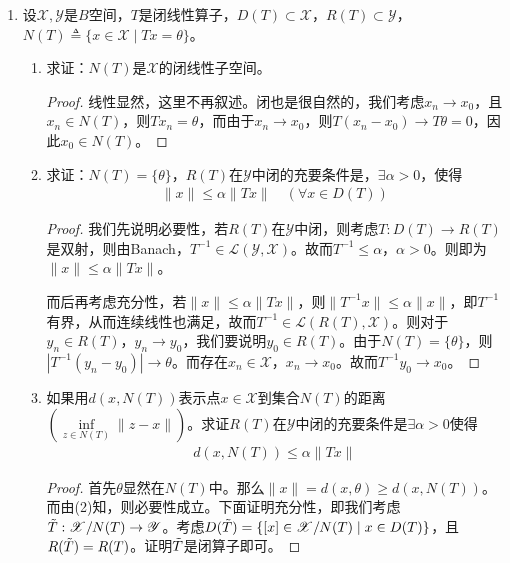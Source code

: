 \begin{enumerate}[leftmargin=2cm, label=\arabic*]
		\item 设$\mathscr{X},\mathscr{Y}$是$B$空间，$T$是闭线性算子，$D(T)\subset \mathscr{X}$，$R(T)\subset\mathscr{Y}$，$N(T)\triangleq\{x\in\mathscr{X}\mid Tx = \theta\}$。
		\begin{enumerate}[leftmargin=1cm, label=(\arabic*)]
			\item 求证：$N(T)$是$\mathscr{X}$的闭线性子空间。
			\begin{proof}
				线性显然，这里不再叙述。闭也是很自然的，我们考虑$x_n\to x_0$，且$x_n\in N(T)$，则$Tx_n = \theta$，而由于$x_n \to x_0$，则$T(x_n-x_0) \to T\theta = 0$，因此$x_0\in N(T)$。
			\end{proof}
			
			\item 求证：$N(T) = \{\theta\}$，$R(T)$在$\mathscr{Y}$中闭的充要条件是，$\exists \alpha>0$，使得
			\begin{align*}
				\|x\| \leqslant \alpha\|Tx\| \quad (\forall x\in D(T))
			\end{align*}
			\begin{proof}
				我们先说明必要性，若$R(T)$在$\mathscr{Y}$中闭，则考虑$T:D(T)\to R(T)$是双射，则由Banach，$T^{-1}\in\mathscr{L}(\mathscr{Y},\mathscr{X})$。故而$T^{-1}\leqslant \alpha$，$\alpha>0$。则即为$\|x\| \leqslant \alpha \|Tx\|$。
				
				而后再考虑充分性，若$\|x\| \leqslant \alpha \|Tx\|$，则$\|T^{-1}x\|\leqslant \alpha \|x\|$，即$T^{-1}$有界，从而连续线性也满足，故而$T^{-1}\in\mathscr{L}(R(T),\mathscr{X})$。则对于$y_n\in R(T)$，$y_n\to y_0$，我们要说明$y_0 \in R(T)$。由于$N(T) = \{\theta\}$，则$|T^{-1}(y_n - y_0)| \to \theta$。而存在$x_n \in\mathscr{X}$，$x_n \to x_0$。故而$T^{-1} y_0 \to x_0$。
			\end{proof}
			
			\item 如果用$d(x,N(T))$表示点$x\in\mathscr{X}$到集合$N(T)$的距离$\left(\inf\limits_{z \in N(T)} \|z - x\|\right)$。求证$R(T)$在$\mathscr{Y}$中闭的充要条件是$\exists \alpha>0$使得
			\begin{align*}
				d(x, N(T)) \leqslant \alpha\|Tx\|
			\end{align*}
			\begin{proof}
				首先$\theta$显然在$N(T)$中。那么$\|x\| = d(x,\theta) \geqslant d(x,N(T))$。而由(2)知，则必要性成立。下面证明充分性，即我们考虑$\Tilde{T}: \mathscr{X}/N(T)\to\mathscr{Y}$。考虑$D(\Tilde{T}) = \{[x]\in \mathscr{X}/N(T)\mid x\in D(T)\}$，且$R(\Tilde{T}) = R(T)$。证明$\Tilde{T}$是闭算子即可。
			\end{proof}
		\end{enumerate}
		

\end{enumerate}
